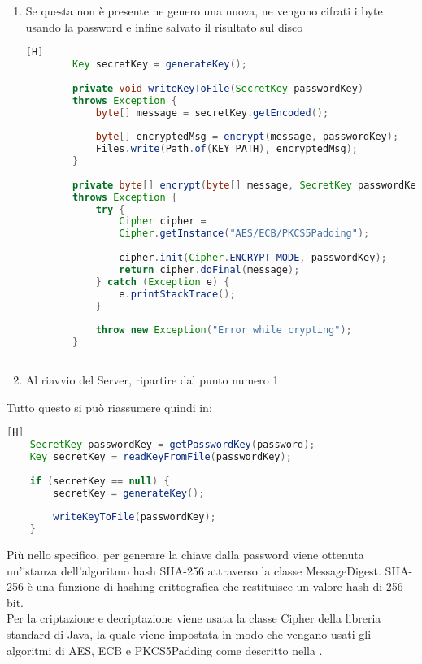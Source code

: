 \begin{enumerate}
\begin{lstlisting}[language=Java][H]
	throw new Exception("Error while decrypting");
}
	\end{lstlisting}
	\item Se questa non è presente ne genero una nuova, ne vengono cifrati i byte usando la password e infine salvato il risultato sul disco
	\begin{lstlisting}[language=Java][H]
		Key secretKey = generateKey();
		
		private void writeKeyToFile(SecretKey passwordKey) 
		throws Exception {
			byte[] message = secretKey.getEncoded();
			
			byte[] encryptedMsg = encrypt(message, passwordKey);
			Files.write(Path.of(KEY_PATH), encryptedMsg);
		}
		
		private byte[] encrypt(byte[] message, SecretKey passwordKey) 
		throws Exception {
			try {
				Cipher cipher = 
				Cipher.getInstance("AES/ECB/PKCS5Padding");
				
				cipher.init(Cipher.ENCRYPT_MODE, passwordKey);
				return cipher.doFinal(message);
			} catch (Exception e) {
				e.printStackTrace();
			}
			
			throw new Exception("Error while crypting");
		}
		
	\end{lstlisting}
	
	\item Al riavvio del Server, ripartire dal punto numero 1
\end{enumerate}


\newpage
\noindent
Tutto questo si può riassumere quindi in:
\begin{lstlisting}[language=Java][H]
	SecretKey passwordKey = getPasswordKey(password);
	Key secretKey = readKeyFromFile(passwordKey);
	
	if (secretKey == null) {
		secretKey = generateKey();
		
		writeKeyToFile(passwordKey);
	}
\end{lstlisting}

\noindent
Più nello specifico, per generare la chiave dalla password viene ottenuta un'istanza dell'algoritmo hash SHA-256 attraverso la classe MessageDigest. SHA-256 è una funzione di hashing crittografica che restituisce un valore hash di 256 bit.\\
Per la criptazione e decriptazione viene usata la classe Cipher della libreria standard di Java, la quale viene impostata in modo che vengano usati gli algoritmi di AES, ECB e PKCS5Padding come descritto nella .

